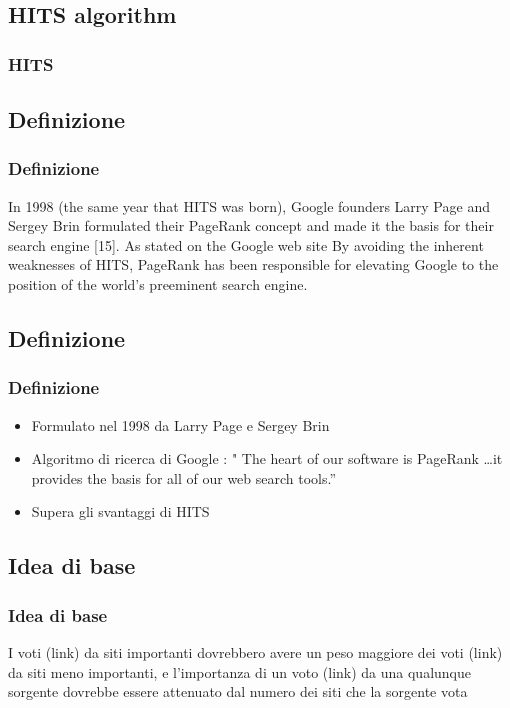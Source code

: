 \documentclass{beamer}
\begin{document}

\subsection{HITS algorithm}
\begin{frame}
	\frametitle{HITS}
	
\end{frame}


\subsection{Definizione}
\begin{frame}
\frametitle{Definizione}
In 1998 (the same year that HITS was born), Google founders Larry Page and Sergey Brin formulated
their PageRank concept and made it the basis for their search engine [15]. As stated on the Google web
site
By avoiding the inherent weaknesses of HITS, PageRank has been responsible for elevating Google to the
position of the world's preeminent search engine.
\end{frame}

\subsection{Definizione}
\begin{frame}
	\frametitle{Definizione}
	\begin{itemize}
		\item Formulato nel 1998 da Larry Page e Sergey Brin
		\item Algoritmo di ricerca di Google : " The heart of our software is PageRank \texttrademark\dots it provides the basis for all of our web search tools.''
		\item Supera gli svantaggi di HITS
	\end{itemize}
\end{frame}

\subsection{Idea di base}
\begin{frame}
	\frametitle{Idea di base}
	I voti (link) da siti importanti dovrebbero avere un peso maggiore dei voti (link) da siti meno importanti, e l'importanza di un voto (link) da una qualunque sorgente dovrebbe essere attenuato dal numero dei siti che la sorgente vota
\end{frame}
\end{document}
